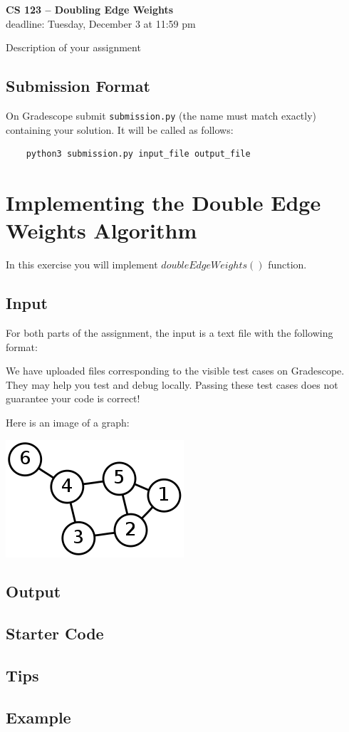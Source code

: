 \documentclass[11pt]{article}
\begin{document}
\begin{center}
\Large{\textbf{CS 123 -- Doubling Edge Weights}}\\
\Large{deadline: Tuesday, December 3 at 11:59 pm}
\end{center}

Description of your assignment
\subsection*{Submission Format}

On Gradescope submit {\tt submission.py}  (the name must match exactly)  containing your solution.
It will be called as follows: 

\begin{verbatim}
	python3 submission.py input_file output_file
\end{verbatim}
\section{Implementing the Double Edge Weights Algorithm}

In this exercise you will implement $doubleEdgeWeights()$ function.

\subsection*{Input}

For both parts of the assignment, the input is a text file with the following format: 

We have uploaded files corresponding to the visible test cases on Gradescope.
They may help you test and debug locally.
Passing these test cases does not guarantee your code is correct!

Here is an image of a graph:

\includegraphics{images/graph.png}

\subsection*{Output}

\subsection*{Starter Code}

\subsection*{Tips}

\subsection*{Example}
\end{document}
